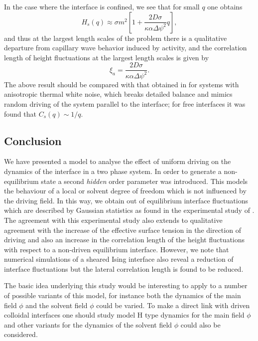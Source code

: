 In the case where the interface is confined, we see that for small $q$ one obtains
\begin{equation}
    H_s(q) \approx \sigma m^2 \left[ 1+ \frac{2D\sigma }{\kappa\alpha \Delta\psi^2}q\right],
\end{equation}
and thus at the largest length scales of the problem there is a qualitative departure from capillary wave behavior induced by activity, and the correlation length of height fluctuations at the largest length scales is given by
\begin{equation}
    \xi_a = \frac{2D\sigma }{\kappa\alpha \Delta\psi^2}.
\end{equation}
The above result should be compared with that obtained in \cite{zia_interfacial_1991} for 
systems with anisotropic thermal white noise, which breaks detailed balance and mimics random driving of the system parallel to the interface; for free interfaces it was found that $C_s(q)\sim 1/q$.

    \subsection{Conclusion}

We have presented a model to analyse the effect of uniform driving on the dynamics of the interface in a two phase system. In order to generate a non-equilibrium state a second {\em hidden} order parameter was introduced. This models the behaviour of a local or solvent degree of freedom which is not influenced by the driving field. In this way, we obtain out of equilibrium interface fluctuations which are described by Gaussian statistics as found in the experimental study of \cite{derks_suppression_2006}. The agreement with this experimental study also extends to qualitative agreement with the increase of the effective surface tension in the direction of driving and also an increase in the correlation length of the height fluctuations with respect to a non-driven equilibrium interface. However, we  note that numerical simulations of a sheared Ising interface \cite{smith_interfaces_2008-1,smith_lateral_2010} also reveal a reduction of interface fluctuations but the lateral correlation length is found to be reduced.

The basic idea underlying this study would be interesting to apply to a number of possible variants of this model, for instance both the dynamics
of the main field $\phi$ and the solvent field $\phi$ could be varied. To make a direct link with driven colloidal interfaces one should study model H type dynamics for the main field $\phi$ and other variants for the dynamics of the 
solvent field $\phi$ could also be considered. 

